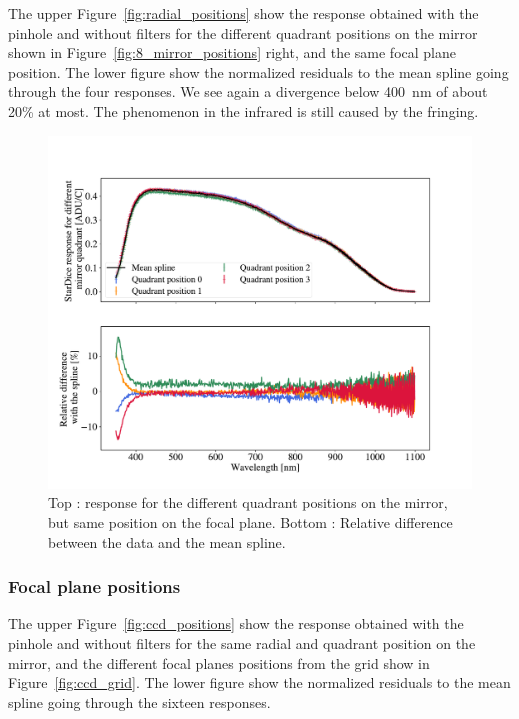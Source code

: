 The upper Figure~\ref{fig:radial_positions} show the \SD response obtained with the \spinhole pinhole and without filters for the different quadrant positions on the mirror shown in Figure~\ref{fig:8_mirror_positions} right, and the same focal plane position. The lower figure show the normalized residuals to the mean spline going through the four responses. We see again a divergence below \SI{400}{\nm} of about 20\% at most. The phenomenon in the infrared is still caused by the fringing. 

\begin{figure}[h]
    \centering
    \includegraphics[width=\columnwidth]{fig/quadrant_positions.pdf}
    \caption{Top : \SD response for the different quadrant positions on the mirror, but same position on the focal plane. Bottom : Relative difference between the data and the mean spline.}
    \label{fig:quadrant_positions}
\end{figure}

\subsubsection{Focal plane positions}

The upper Figure~\ref{fig:ccd_positions} show the \SD response obtained with the \spinhole pinhole and without filters for the same radial and quadrant position on the mirror, and the different focal planes positions from the grid show in Figure~\ref{fig:ccd_grid}. The lower figure show the normalized residuals to the mean spline going through the sixteen responses.

